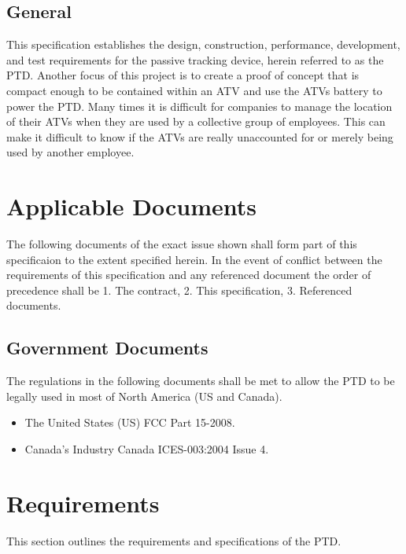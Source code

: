 \documentclass[11pt]{article}
\begin{document}
\subsection{General}
This specification establishes the design, construction, performance, development, and test requirements for the passive tracking device, 
herein referred to as the PTD. Another focus of this project is to create a proof of concept that is compact enough to be contained within an ATV 
and use the ATVs battery to power the PTD. Many times it is difficult for companies to manage the location of their ATVs when they are used by 
a collective group of employees. This can make it difficult to know if the ATVs are really unaccounted for or merely being used by another 
employee.

\section{Applicable Documents}
The following documents of the exact issue shown shall form part of this specificaion to the extent specified herein. In the event of 
conflict between the requirements of this specification and any referenced document the order of precedence shall be 1. The contract, 
2. This specification, 3. Referenced documents.

\subsection{Government Documents}
The regulations in the following documents shall be met to allow the PTD to be legally used in most of North America (US and Canada).
\begin{itemize}
    \item The United States (US) FCC Part 15-2008.
    \item Canada's Industry Canada ICES-003:2004 Issue 4.
\end{itemize}

\section{Requirements}
This section outlines the requirements and specifications of the PTD. 
\end{document}
